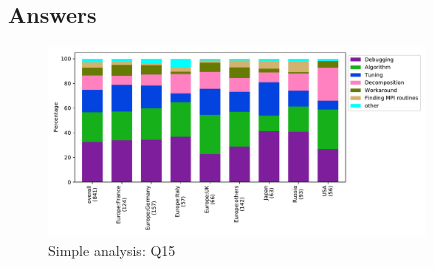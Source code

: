 
\subsection{Answers}


\begin{figure}[htb]
\begin{center}
\includegraphics[width=10cm]{../pdfs/Q15.pdf}
\caption{Simple analysis: Q15}
\label{fig:Q15}
\end{center}
\end{figure}

